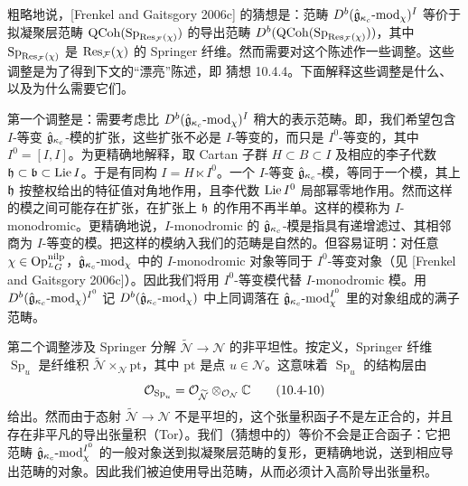 粗略地说，[Frenkel and Gaitsgory 2006c] 的猜想是：范畴 $D^b(\hat{\mathfrak{g}}_{\kappa_c}\text{-}\mathrm{mod}_\chi)^I$ 等价于拟凝聚层范畴 $\mathrm{QCoh}(\operatorname{Sp}_{\operatorname{Res}_{\mathcal{F}}(\chi)})$ 的导出范畴 $D^b(\mathrm{QCoh}(\operatorname{Sp}_{\operatorname{Res}_{\mathcal{F}}(\chi)}))$，其中 $\operatorname{Sp}_{\operatorname{Res}_{\mathcal{F}}(\chi)}$ 是 $\operatorname{Res}_{\mathcal{F}}(\chi)$ 的 Springer 纤维。然而需要对这个陈述作一些调整。这些调整是为了得到下文的“漂亮”陈述，即 猜想 10.4.4。下面解释这些调整是什么、以及为什么需要它们。

第一个调整是：需要考虑比 $D^b(\hat{\mathfrak{g}}_{\kappa_c}\text{-}\mathrm{mod}_\chi)^I$ 稍大的表示范畴。即，我们希望包含 $I$-等变 $\hat{\mathfrak{g}}_{\kappa_c}$-模的扩张，这些扩张不必是 $I$-等变的，而只是 $I^0$-等变的，其中 $I^0=[I,I]$。为更精确地解释，取 Cartan 子群 $H\subset B\subset I$ 及相应的李子代数 $\mathfrak{h}\subset\mathfrak{b}\subset\operatorname{Lie} I$。于是有同构 $I=H\ltimes I^0$。一个 $I$-等变 $\hat{\mathfrak{g}}_{\kappa_c}$-模，等同于一个模，其上 $\mathfrak{h}$ 按整权给出的特征值对角地作用，且李代数 $\operatorname{Lie} I^0$ 局部幂零地作用。然而这样的模之间可能存在扩张，在扩张上 $\mathfrak{h}$ 的作用不再半单。这样的模称为 $I$-monodromic。更精确地说，$I$-monodromic 的 $\hat{\mathfrak{g}}_{\kappa_c}$-模是指具有递增滤过、其相邻商为 $I$-等变的模。把这样的模纳入我们的范畴是自然的。但容易证明：对任意 $\chi\in\operatorname{Op}^{\mathrm{nilp}}_{{}^L G}$，$\hat{\mathfrak{g}}_{\kappa_c}\text{-}\mathrm{mod}_\chi$ 中的 $I$-monodromic 对象等同于 $I^0$-等变对象（见 [Frenkel and Gaitsgory 2006c]）。因此我们将用 $I^0$-等变模代替 $I$-monodromic 模。用 $D^b(\hat{\mathfrak{g}}_{\kappa_c}\text{-}\mathrm{mod}_\chi)^{I^0}$ 记 $D^b(\hat{\mathfrak{g}}_{\kappa_c}\text{-}\mathrm{mod}_\chi)$ 中上同调落在 $\hat{\mathfrak{g}}_{\kappa_c}\text{-}\mathrm{mod}_\chi^{I^0}$ 里的对象组成的满子范畴。

第二个调整涉及 Springer 分解 $\widetilde{\mathcal{N}}\to\mathcal{N}$ 的非平坦性。按定义，Springer 纤维 $\operatorname{Sp}_u$ 是纤维积 $\widetilde{\mathcal{N}}\times_{\mathcal{N}}\mathrm{pt}$，其中 $\mathrm{pt}$ 是点 $u\in\mathcal{N}$。这意味着 $\operatorname{Sp}_u$ 的结构层由
\begin{equation}
    \mathcal{O}_{\operatorname{Sp}_u}=\mathcal{O}_{\widetilde{\mathcal{N}}}\otimes_{\mathcal{O}_{\mathcal{N}}}\mathbb{C}
    \tag{10.4-10}
\end{equation}
给出。然而由于态射 $\widetilde{\mathcal{N}}\to\mathcal{N}$ 不是平坦的，这个张量积函子不是左正合的，并且存在非平凡的导出张量积（Tor）。我们（猜想中的）等价不会是正合函子：它把范畴 $\hat{\mathfrak{g}}_{\kappa_c}\text{-}\mathrm{mod}_\chi^{I^0}$ 的一般对象送到拟凝聚层范畴的复形，更精确地说，送到相应导出范畴的对象。因此我们被迫使用导出范畴，从而必须计入高阶导出张量积。


